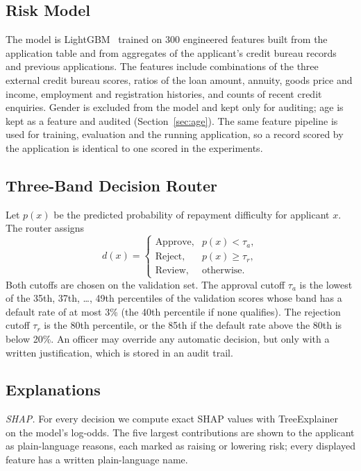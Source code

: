 \subsection{Risk Model}
The model is LightGBM~\cite{ke2017lightgbm} trained on 300 engineered features built from the application table and
from aggregates of the applicant's credit bureau records and previous applications. The features include combinations
of the three external credit bureau scores, ratios of the loan amount, annuity, goods price and income, employment and
registration histories, and counts of recent credit enquiries. Gender is excluded from the model and kept only for
auditing; age is kept as a feature and audited (Section~\ref{sec:age}). The same feature pipeline is used for
training, evaluation and the running application, so a record scored by the application is identical to one scored
in the experiments.

\subsection{Three-Band Decision Router}
Let $p(x)$ be the predicted probability of repayment difficulty for applicant $x$. The router assigns
\begin{equation}
d(x) =
\begin{cases}
\text{Approve}, & p(x) < \tau_a,\\
\text{Reject}, & p(x) \geq \tau_r,\\
\text{Review}, & \text{otherwise}.
\end{cases}
\label{eq:router}
\end{equation}
Both cutoffs are chosen on the validation set. The approval cutoff $\tau_a$ is the lowest of the 35th, 37th, \ldots,
49th percentiles of the validation scores whose band has a default rate of at most 3\% (the 40th percentile if none
qualifies). The rejection cutoff $\tau_r$ is the 80th percentile, or the 85th if the default rate above the 80th is
below 20\%. An officer may override any automatic decision, but only with a written justification, which is stored in
an audit trail.

\subsection{Explanations}
\emph{SHAP.} For every decision we compute exact SHAP values with TreeExplainer~\cite{lundberg2020tree} on the model's
log-odds. The five largest contributions are shown to the applicant as plain-language reasons, each marked as raising
or lowering risk; every displayed feature has a written plain-language name.

